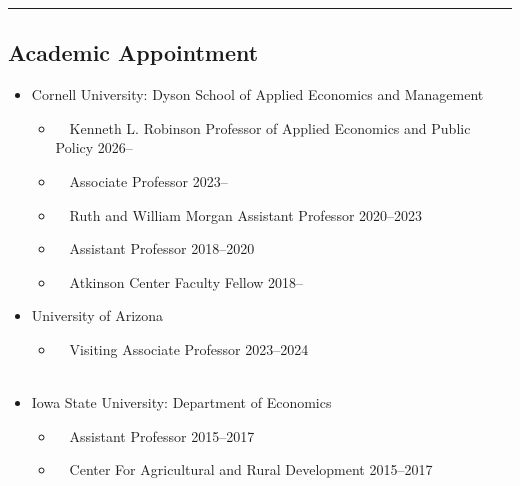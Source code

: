 \documentclass[11pt]{res} %
\begin{document}
\begin{resume}
\vspace{-0.08in}
\hrule
\vspace{-0.1in}

\subsection{Academic Appointment}


	\begin{itemize} \itemsep -12pt
	\item[] Cornell University: Dyson School of Applied Economics and Management
		\vspace{-0.05in}
		\begin{itemize} \itemsep -1pt
			\item[] \,\,\,\, Kenneth L. Robinson Professor of Applied Economics and Public Policy \hfill 2026--
			\item[] \,\,\,\, Associate Professor \hfill 2023--
			\item[] \,\,\,\, Ruth and William Morgan Assistant Professor \hfill 2020--2023
			\item[] \,\,\,\, Assistant Professor \hfill 2018--2020
			\item[] \,\,\,\, Atkinson Center Faculty Fellow \hfill 2018--\\
		\end{itemize}
		\item[] University of Arizona
		\vspace{-0.05in} 
		\begin{itemize}
			\item[] \,\,\,\, Visiting Associate Professor \hfill 2023--2024\\\
		\end{itemize}
		\item[] Iowa State University: Department of Economics
		\vspace{-0.05in}
		\begin{itemize} \itemsep -1pt
			\item[] \,\,\,\, Assistant Professor \hfill 2015--2017
			\item[] \,\,\,\, Center For Agricultural and Rural Development \hfill 2015--2017 \\\
		\end{itemize}
	\end{itemize}
\vspace{-0.5in}


\end{resume}
\end{document}
